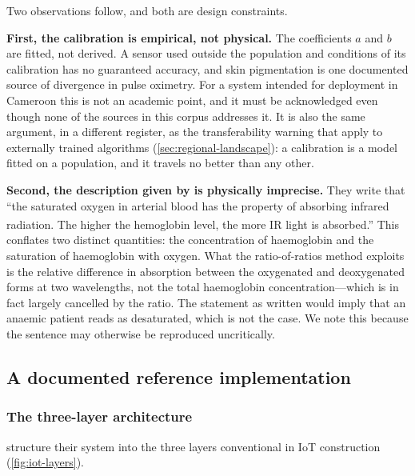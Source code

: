 \documentclass[12pt,a4paper,oneside]{report}
\newcommand{\bq}[1]{``#1''\textsuperscript{\dag}}
\begin{document}
Two observations follow, and both are design constraints.

\textbf{First, the calibration is empirical, not physical.} The coefficients $a$ and $b$ are fitted, not derived. A sensor used outside the population and conditions of its calibration has no guaranteed accuracy, and skin pigmentation is one documented source of divergence in pulse oximetry. For a system intended for deployment in Cameroon this is not an academic point, and it must be acknowledged even though none of the sources in this corpus addresses it. It is also the same argument, in a different register, as the transferability warning that \textcite{segun2025} apply to externally trained algorithms (\cref{sec:regional-landscape}): a calibration is a model fitted on a population, and it travels no better than any other.

\textbf{Second, the description given by \textcite{efendi2025} is physically imprecise.} They write that \bq{the saturated oxygen in arterial blood has the property of absorbing infrared radiation. The higher the hemoglobin level, the more IR light is absorbed.} This conflates two distinct quantities: the concentration of haemoglobin and the saturation of haemoglobin with oxygen. What the ratio-of-ratios method exploits is the relative difference in absorption between the oxygenated and deoxygenated forms at two wavelengths, not the total haemoglobin concentration---which is in fact largely cancelled by the ratio. The statement as written would imply that an anaemic patient reads as desaturated, which is not the case. We note this because the sentence may otherwise be reproduced uncritically.

\subsection{A documented reference implementation}\label{sec:reference-impl}

\subsubsection{The three-layer architecture}

\Textcite{efendi2025} structure their system into the three layers conventional in IoT construction (\cref{fig:iot-layers}).
\end{document}
